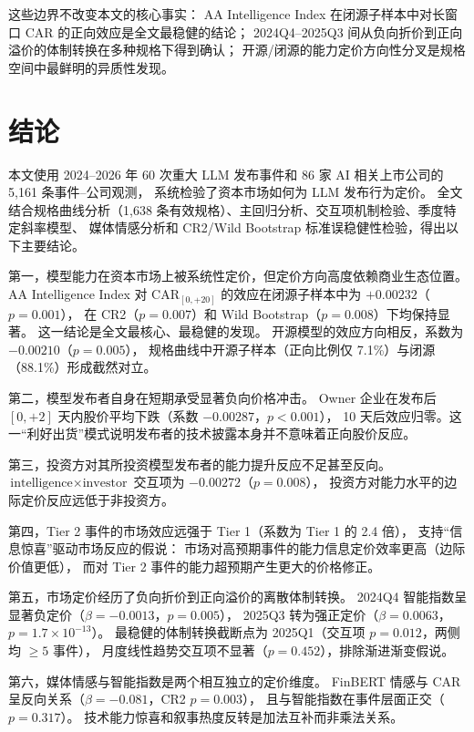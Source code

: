 \documentclass[11pt,fontset=fandol,a4paper]{ctexart}
\begin{document}
这些边界不改变本文的核心事实：
AA Intelligence Index 在闭源子样本中对长窗口 CAR 的正向效应是全文最稳健的结论；
2024Q4--2025Q3 间从负向折价到正向溢价的体制转换在多种规格下得到确认；
开源/闭源的能力定价方向性分叉是规格空间中最鲜明的异质性发现。

\section{结论}

本文使用 2024--2026 年 60 次重大 LLM 发布事件和 86 家 AI 相关上市公司的 5{,}161 条事件--公司观测，
系统检验了资本市场如何为 LLM 发布行为定价。
全文结合规格曲线分析（1{,}638 条有效规格）、主回归分析、交互项机制检验、季度特定斜率模型、
媒体情感分析和 CR2/Wild Bootstrap 标准误稳健性检验，得出以下主要结论。

第一，模型能力在资本市场上被系统性定价，但定价方向高度依赖商业生态位置。
AA Intelligence Index 对 $\text{CAR}_{[0,+20]}$ 的效应在闭源子样本中为 $+0.00232$（$p=0.001$），
在 CR2（$p=0.007$）和 Wild Bootstrap（$p=0.008$）下均保持显著。
这一结论是全文最核心、最稳健的发现。
开源模型的效应方向相反，系数为 $-0.00210$（$p=0.005$），
规格曲线中开源子样本（正向比例仅 7.1\%）与闭源（88.1\%）形成截然对立。

第二，模型发布者自身在短期承受显著负向价格冲击。
Owner 企业在发布后 $[0,+2]$ 天内股价平均下跌（系数 $-0.00287$，$p<0.001$），
10 天后效应归零。这一``利好出货''模式说明发布者的技术披露本身并不意味着正向股价反应。

第三，投资方对其所投资模型发布者的能力提升反应不足甚至反向。
$\text{intelligence}\times\text{investor}$ 交互项为 $-0.00272$（$p=0.008$），
投资方对能力水平的边际定价反应远低于非投资方。

第四，Tier 2 事件的市场效应远强于 Tier 1（系数为 Tier 1 的 2.4 倍），
支持``信息惊喜''驱动市场反应的假说：
市场对高预期事件的能力信息定价效率更高（边际价值更低），
而对 Tier 2 事件的能力超预期产生更大的价格修正。

第五，市场定价经历了负向折价到正向溢价的离散体制转换。
2024Q4 智能指数呈显著负定价（$\beta=-0.0013$，$p=0.005$），
2025Q3 转为强正定价（$\beta=0.0063$，$p=1.7\times10^{-13}$）。
最稳健的体制转换截断点为 2025Q1（交互项 $p=0.012$，两侧均 $\geq5$ 事件），
月度线性趋势交互项不显著（$p=0.452$），排除渐进渐变假说。

第六，媒体情感与智能指数是两个相互独立的定价维度。
FinBERT 情感与 CAR 呈反向关系（$\beta=-0.081$，CR2 $p=0.003$），
且与智能指数在事件层面正交（$p=0.317$）。
技术能力惊喜和叙事热度反转是加法互补而非乘法关系。
\end{document}
